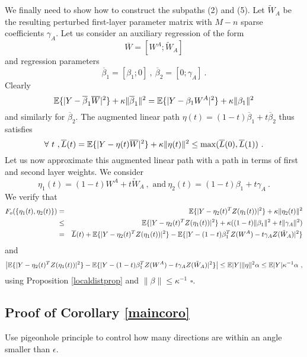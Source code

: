 We finally need to show how to construct the subpaths (2) and (5).
Let $\tilde{W}_A$ be the resulting perturbed first-layer parameter matrix 
with $M-n$ sparse coefficients $\gamma_A$.
Let us consider an auxiliary regression of the form 
$$\overline{W} = [ W^A ; \tilde{W}_A]$$
and regression parameters 
$$\overline{\beta}_1 = [ \beta_1; 0]~,~\overline{\beta}_2 = [0; \gamma_A]~.$$
Clearly 
$${\mathbb{E}}\{ | Y - \overline{\beta}_1 \overline{W} |^2 \} + \kappa \| \overline{\beta}_1 \|^2 = {\mathbb{E}}\{ | Y - \beta_1 W^A |^2 \} + \kappa \| {\beta}_1 \|^2 $$ 
and similarly for $\overline{\beta}_2$. The augmented linear path $\eta(t) =(1- t) \overline{\beta}_1 + t \overline{\beta}_2$ thus satisfies 
$$\forall~t~,\overline{L}(t) = {\mathbb{E}}\{ | Y - \eta(t) \overline{W} |^2 \} + \kappa \| \eta(t) \|^2 \leq \max(\overline{L}(0), \overline{L}(1))~. $$
Let us now approximate this augmented linear path with a path in terms of first and second layer weights. 
We consider
$$\eta_1(t) = (1-t) W^A + t \tilde{W}_A~,\text{ and}~\eta_2(t) = (1- t) {\beta}_1 + t \gamma_A~.$$
We verify that 
\begin{eqnarray*}
F_{o}(\{ \eta_1(t), \eta_2(t) \}) &=& {\mathbb{E}} \{ | Y - \eta_2(t)^T Z(\eta_1(t) ) |^2 \} + \kappa \| \eta_2(t) \|^2 \\
&\leq & {\mathbb{E}} \{ | Y - \eta_2(t)^T Z(\eta_1(t) ) |^2 \} + \kappa(  ( 1-t) \| {\beta}_1\|^2 + t \| \gamma_A \|^2 ) \\
& = & \overline{L}(t) + {\mathbb{E}} \{ | Y - \eta_2(t)^T Z(\eta_1(t) ) |^2 \}  - {\mathbb{E}} \{ | Y - (1-t) \beta_1^T Z(W^A) - t \gamma_A Z(\tilde{W}_A) |^2 \} \\ 
\end{eqnarray*}
and 
$$\left | {\mathbb{E}} \{ | Y - \eta_2(t)^T Z(\eta_1(t) ) |^2 \}  - {\mathbb{E}} \{ | Y - (1-t) \beta_1^T Z(W^A) - t \gamma_A Z(\tilde{W}_A) |^2 \} \right| \leq {\mathbb{E}} |Y| \| \eta \|^2 \alpha \leq {\mathbb{E}} |Y| \kappa^{-1} \alpha~,$$
using Proposition \ref{localdistprop} and  $\| \beta \| \leq \kappa^{-1}$  $\square$.

\subsection{Proof of Corollary \ref{maincoro}}


Use pigeonhole principle to control how many directions are within an angle smaller than $\epsilon$. 






